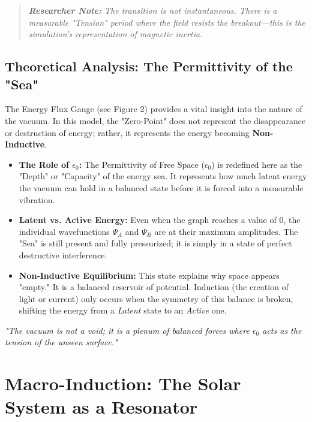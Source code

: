 \documentclass[11pt]{article}
\begin{document}
\begin{quote}
\textit{\textbf{Researcher Note:} The transition is not instantaneous. There is a measurable "Tension" period where the field resists the breakout—this is the simulation’s representation of magnetic inertia.}
\end{quote}

\subsection*{Theoretical Analysis: The Permittivity of the "Sea"}

The Energy Flux Gauge (see Figure 2) provides a vital insight into the nature of the vacuum. In this model, the "Zero-Point" does not represent the disappearance or destruction of energy; rather, it represents the energy becoming \textbf{Non-Inductive}.

\begin{itemize}
    \item \textbf{The Role of $\epsilon_0$:} The Permittivity of Free Space ($\epsilon_0$) is redefined here as the "Depth" or "Capacity" of the energy sea. It represents how much latent energy the vacuum can hold in a balanced state before it is forced into a measurable vibration.
    \item \textbf{Latent vs. Active Energy:} Even when the graph reaches a value of $0$, the individual wavefunctions $\Psi_A$ and $\Psi_B$ are at their maximum amplitudes. The "Sea" is still present and fully pressurized; it is simply in a state of perfect destructive interference.
    \item \textbf{Non-Inductive Equilibrium:} This state explains why space appears "empty." It is a balanced reservoir of potential. Induction (the creation of light or current) only occurs when the symmetry of this balance is broken, shifting the energy from a \textit{Latent} state to an \textit{Active} one.
\end{itemize}

\begin{center}
    \textit{"The vacuum is not a void; it is a plenum of balanced forces where $\epsilon_0$ acts as the tension of the unseen surface."}
\end{center}

\section*{Macro-Induction: The Solar System as a Resonator}
\end{document}
